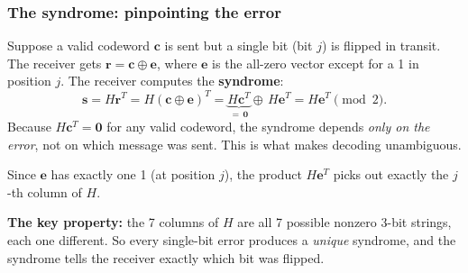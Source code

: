 \documentclass[11pt, a4paper]{article}
\theoremstyle{definition}
\theoremstyle{plain}
\theoremstyle{remark}
\begin{document}
\subsubsection{The syndrome: pinpointing the error}

Suppose a valid codeword $\mathbf{c}$ is sent but a single bit
(bit $j$) is flipped in transit.  The receiver gets
$\mathbf{r} = \mathbf{c} \oplus \mathbf{e}$,
where $\mathbf{e}$ is the all-zero vector except for a 1 in position
$j$.  The receiver computes the \textbf{syndrome}:
\[
  \mathbf{s}
  = H\mathbf{r}^T
  = H(\mathbf{c} \oplus \mathbf{e})^T
  = \underbrace{H\mathbf{c}^T}_{=\,\mathbf{0}}
    \oplus\, H\mathbf{e}^T
  = H\mathbf{e}^T \pmod{2}.
\]
Because $H\mathbf{c}^T = \mathbf{0}$ for any valid codeword, the
syndrome depends \emph{only on the error}, not on which message was
sent.  This is what makes decoding unambiguous.

Since $\mathbf{e}$ has exactly one 1 (at position $j$), the product
$H\mathbf{e}^T$ picks out exactly the $j$-th column of $H$.

\medskip\noindent
\textbf{The key property:} the 7 columns of $H$ are all 7 possible
nonzero 3-bit strings, each one different.  So every single-bit error
produces a \emph{unique} syndrome, and the syndrome tells the receiver
exactly which bit was flipped.
\end{document}
